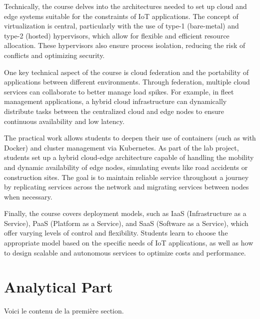 Technically, the course delves into the architectures needed to set up cloud and edge systems suitable for the constraints of IoT applications. The concept of virtualization is central, particularly with the use of type-1 (bare-metal) and type-2 (hosted) hypervisors, which allow for flexible and efficient resource allocation. These hypervisors also ensure process isolation, reducing the risk of conflicts and optimizing security.

One key technical aspect of the course is cloud federation and the portability of applications between different environments. Through federation, multiple cloud services can collaborate to better manage load spikes. For example, in fleet management applications, a hybrid cloud infrastructure can dynamically distribute tasks between the centralized cloud and edge nodes to ensure continuous availability and low latency.

The practical work allows students to deepen their use of containers (such as with Docker) and cluster management via Kubernetes. As part of the lab project, students set up a hybrid cloud-edge architecture capable of handling the mobility and dynamic availability of edge nodes, simulating events like road accidents or construction sites. The goal is to maintain reliable service throughout a journey by replicating services across the network and migrating services between nodes when necessary.

Finally, the course covers deployment models, such as IaaS (Infrastructure as a Service), PaaS (Platform as a Service), and SaaS (Software as a Service), which offer varying levels of control and flexibility. Students learn to choose the appropriate model based on the specific needs of IoT applications, as well as how to design scalable and autonomous services to optimize costs and performance.

\section{Analytical Part}
Voici le contenu de la première section.


